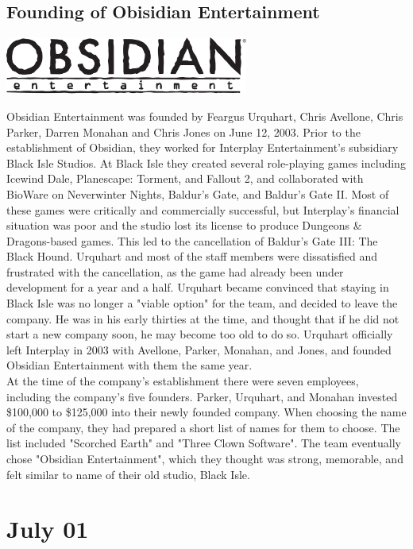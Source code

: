 \documentclass[11pt]{report}
\begin{document}
\subsection{Founding of Obisidian Entertainment}
\vspace{2mm}\begin{center}\includegraphics[width=8cm]{./img/obsidianLogo.jpg}\end{center}
Obsidian Entertainment was founded by Feargus Urquhart, Chris Avellone, Chris Parker, Darren Monahan and Chris Jones on June 12, 2003. Prior to the establishment of Obsidian, they worked for Interplay Entertainment's subsidiary Black Isle Studios. At Black Isle they created several role-playing games including Icewind Dale, Planescape: Torment, and Fallout 2, and collaborated with BioWare on Neverwinter Nights, Baldur's Gate, and Baldur's Gate II. Most of these games were critically and commercially successful, but Interplay's financial situation was poor and the studio lost its license to produce Dungeons \& Dragons-based games. This led to the cancellation of Baldur's Gate III: The Black Hound. Urquhart and most of the staff members were dissatisfied and frustrated with the cancellation, as the game had already been under development for a year and a half. Urquhart became convinced that staying in Black Isle was no longer a "viable option" for the team, and decided to leave the company. He was in his early thirties at the time, and thought that if he did not start a new company soon, he may become too old to do so. Urquhart officially left Interplay in 2003 with Avellone, Parker, Monahan, and Jones, and founded Obsidian Entertainment with them the same year.\\
\indent At the time of the company's establishment there were seven employees, including the company's five founders. Parker, Urquhart, and Monahan invested \$100,000 to \$125,000 into their newly founded company. When choosing the name of the company, they had prepared a short list of names for them to choose. The list included "Scorched Earth" and "Three Clown Software". The team eventually chose "Obsidian Entertainment", which they thought was strong, memorable, and felt similar to name of their old studio, Black Isle.
\section{July 01}
\end{document}
